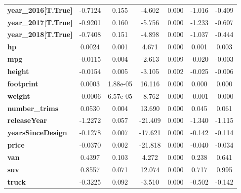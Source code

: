 \begin{center}
\begin{tabular}{lcccccc}
\textbf{year\_2016[T.True]} &      -0.7124  &        0.155     &    -4.602  &         0.000        &       -1.016    &       -0.409     \\
\textbf{year\_2017[T.True]} &      -0.9201  &        0.160     &    -5.756  &         0.000        &       -1.233    &       -0.607     \\
\textbf{year\_2018[T.True]} &      -0.7408  &        0.151     &    -4.898  &         0.000        &       -1.037    &       -0.444     \\
\textbf{hp}                 &       0.0024  &        0.001     &     4.671  &         0.000        &        0.001    &        0.003     \\
\textbf{mpg}                &      -0.0115  &        0.004     &    -2.613  &         0.009        &       -0.020    &       -0.003     \\
\textbf{height}             &      -0.0154  &        0.005     &    -3.105  &         0.002        &       -0.025    &       -0.006     \\
\textbf{footprint}          &       0.0003  &     1.88e-05     &    16.116  &         0.000        &        0.000    &        0.000     \\
\textbf{weight}             &      -0.0006  &     6.57e-05     &    -8.762  &         0.000        &       -0.001    &       -0.000     \\
\textbf{number\_trims}      &       0.0530  &        0.004     &    13.690  &         0.000        &        0.045    &        0.061     \\
\textbf{releaseYear}        &      -1.2272  &        0.057     &   -21.409  &         0.000        &       -1.340    &       -1.115     \\
\textbf{yearsSinceDesign}   &      -0.1278  &        0.007     &   -17.621  &         0.000        &       -0.142    &       -0.114     \\
\textbf{price}              &      -0.0370  &        0.002     &   -21.818  &         0.000        &       -0.040    &       -0.034     \\
\textbf{van}                &       0.4397  &        0.103     &     4.272  &         0.000        &        0.238    &        0.641     \\
\textbf{suv}                &       0.8557  &        0.071     &    12.074  &         0.000        &        0.717    &        0.995     \\
\textbf{truck}              &      -0.3225  &        0.092     &    -3.510  &         0.000        &       -0.502    &       -0.142     \\

\end{tabular}
\end{center}

